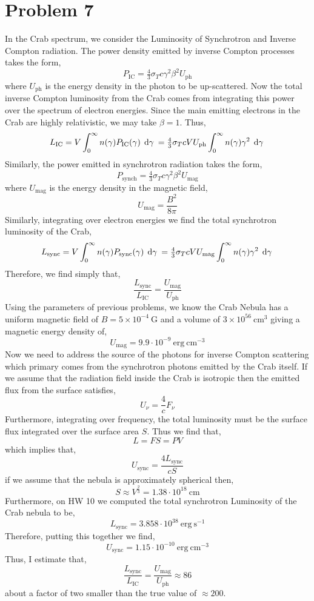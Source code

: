 \documentclass[12pt]{article}
\begin{document}
\section{Problem 7}

In the Crab spectrum, we consider the Luminosity of Synchrotron and Inverse Compton radiation. The power density emitted by inverse Compton processes takes the form,
\[ P_{\text{IC}} = \tfrac{4}{3} \sigma_T c \gamma^2 \beta^2 U_{\text{ph}} \]
where $U_{\text{ph}}$ is the energy density in the photon to be up-scattered. Now the total inverse Compton luminosity from the Crab comes from integrating this power over the spectrum of electron energies. Since the main emitting electrons in the Crab are highly relativistic, we may take $\beta = 1$. Thus,
\[ L_{\text{IC}} = V \int_{0}^{\infty} n(\gamma) P_{\text{IC}}(\gamma) \: \: \mathrm{d}\gamma \: = \tfrac{4}{3} \sigma_T c V U_{\text{ph}} \int_0^{\infty} n(\gamma) \gamma^2 \: \: \mathrm{d}\gamma \: \]
Similarly, the power emitted in synchrotron radiation takes the form,
\[ P_{\text{synch}} = \tfrac{4}{3} \sigma_T c \gamma^2 \beta^2 U_{\text{mag}} \]
where $U_{\text{mag}}$ is the energy density in the magnetic field,
\[ U_{\text{mag}} = \frac{B^2}{8 \pi} \]
Similarly, integrating over electron energies we find the total synchrotron luminosity of the Crab,
\[ L_{\text{sync}} = V  \int_{0}^{\infty} n(\gamma) P_{\text{sync}}(\gamma) \: \: \mathrm{d}\gamma \: = \tfrac{4}{3} \sigma_T c V U_{\text{mag}} \int_0^{\infty} n(\gamma) \gamma^2 \: \: \mathrm{d}\gamma \: \]
Therefore, we find simply that,
\[ \frac{L_{\text{sync}}}{L_{\text{IC}}} = \frac{U_{\text{mag}}}{U_{\text{ph}}} \]
Using the parameters of previous problems, we know the Crab Nebula has a uniform magnetic field of $B = 5 \times 10^{-4} \: \mathrm{G}$ and a volume of $3 \times 10^{56} \: \mathrm{cm}^3$ giving a magnetic energy density of,
\[ U_{\text{mag}} = 9.9 \cdot 10^{-9} \: \mathrm{erg} \: \mathrm{cm}^{-3} \]
Now we need to address the source of the photons for inverse Compton scattering which primary comes from the synchrotron photons emitted by the Crab itself. If we assume that the radiation field inside the Crab is isotropic then the emitted flux from the surface satisfies, 
\[ U_\nu = \frac{4}{c} F_\nu \] 
Furthermore, integrating over frequency, the total luminosity must be the surface flux integrated over the surface area $S$. Thus we find that,
\[ L = FS = PV \]
which implies that,
\[ U_{\text{sync}} = \frac{4 L_{\text{sync}}}{c S} \]
if we assume that the nebula is approximately spherical then,
\[ S \approx V^{\frac{2}{3}} = 1.38 \cdot 10^{18} \: \mathrm{cm} \]
Furthermore, on HW 10 we computed the total synchrotron Luminosity of the Crab nebula to be,
\[ L_{\text{sync}} = 3.858 \cdot 10^{38} \: \mathrm{erg} \: \mathrm{s}^{-1} \]
Therefore, putting this together we find,
\[ U_{\text{sync}} = 1.15 \cdot 10^{-10} \: \mathrm{erg} \: \mathrm{cm}^{-3} \]
Thus, I estimate that,
\[ \frac{L_{\text{sync}}}{L_{\text{IC}}} = \frac{U_{\text{mag}}}{U_{\text{ph}}} \approx 86  \]
about a factor of two smaller than the true value of $\approx 200$. 
\end{document}
